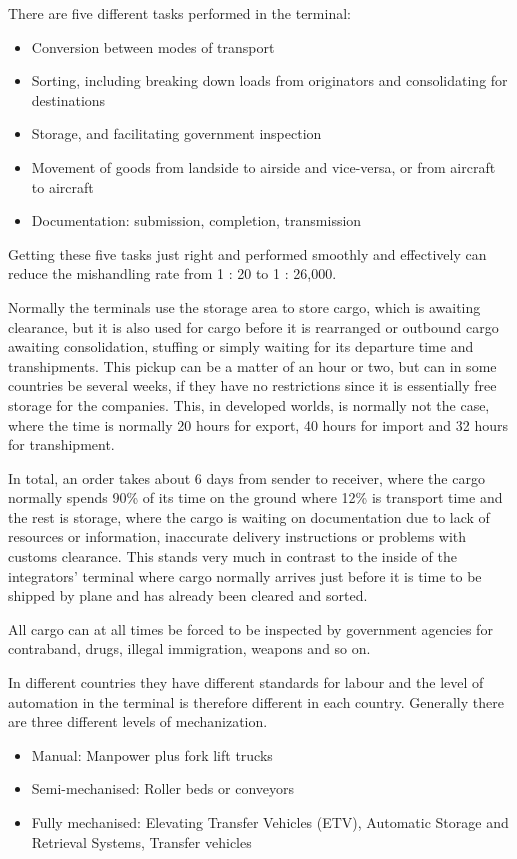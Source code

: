 There are five different tasks performed in the terminal:
\begin{itemize}
\item Conversion between modes of transport
\item Sorting, including breaking down loads from originators and consolidating for destinations
\item Storage, and facilitating government inspection
\item Movement of goods from landside to airside and vice-versa, or from aircraft to aircraft
\item Documentation: submission, completion, transmission
\end{itemize}

Getting these five tasks just right and performed smoothly and effectively can reduce the mishandling rate from 1 : 20 to 1 : 26,000.

Normally the terminals use the storage area to store cargo, which is awaiting clearance, but it is also used for cargo before it is rearranged or outbound cargo awaiting consolidation, stuffing or simply waiting for its departure time and transhipments. This pickup can be a matter of an hour or two, but can in some countries be several weeks, if they have no restrictions since it is essentially free storage for the companies. This, in developed worlds, is normally not the case, where the time is normally 20 hours for export, 40 hours for import and 32 hours for transhipment. %

In total, an order takes about 6 days from sender to receiver, where the cargo normally spends 90\% of its time on the ground where 12\% is transport time and the rest is storage, where the cargo is waiting on documentation due to lack of resources or information, inaccurate delivery instructions or problems with customs clearance. This stands very much in contrast to the inside of the integrators' terminal where cargo normally arrives just before it is time to be shipped by plane and has already been cleared and sorted.%

All cargo can at all times be forced to be inspected by government agencies for contraband, drugs, illegal immigration, weapons and so on.

In different countries they have different standards for labour and the level of automation in the terminal is therefore different in each country. Generally there are three different levels of mechanization.
\begin{itemize}
\item Manual: Manpower plus fork lift trucks
\item Semi-mechanised: Roller beds or conveyors
\item Fully mechanised: Elevating Transfer Vehicles (ETV), Automatic Storage and Retrieval Systems, Transfer vehicles
\end{itemize}

